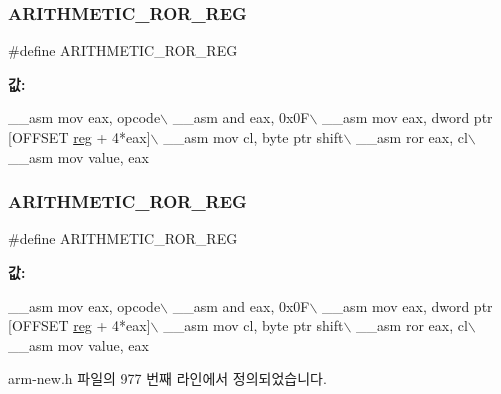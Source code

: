 \subsubsection{\texorpdfstring{A\+R\+I\+T\+H\+M\+E\+T\+I\+C\+\_\+\+R\+O\+R\+\_\+\+R\+EG}{ARITHMETIC\_ROR\_REG}\hspace{0.1cm}{\footnotesize\ttfamily [1/2]}}
{\footnotesize\ttfamily \#define A\+R\+I\+T\+H\+M\+E\+T\+I\+C\+\_\+\+R\+O\+R\+\_\+\+R\+EG}

{\bfseries 값\+:}
\begin{DoxyCode}
\_\_asm mov eax, opcode\(\backslash\)
        \_\_asm and eax, 0x0F\(\backslash\)
        \_\_asm mov eax, dword ptr [OFFSET \mbox{\hyperlink{_g_b_a_8h_ae29faba89509024ffd1a292badcedf2d}{reg}} + 4*eax]\(\backslash\)
        \_\_asm mov cl, byte ptr shift\(\backslash\)
        \_\_asm ror eax, cl\(\backslash\)
        \_\_asm mov value, eax
\end{DoxyCode}
\mbox{\label{arm-new_8h_add20b224236ad60d0152fad9d84f3f9d}} 
\subsubsection{\texorpdfstring{A\+R\+I\+T\+H\+M\+E\+T\+I\+C\+\_\+\+R\+O\+R\+\_\+\+R\+EG}{ARITHMETIC\_ROR\_REG}\hspace{0.1cm}{\footnotesize\ttfamily [2/2]}}
{\footnotesize\ttfamily \#define A\+R\+I\+T\+H\+M\+E\+T\+I\+C\+\_\+\+R\+O\+R\+\_\+\+R\+EG}

{\bfseries 값\+:}
\begin{DoxyCode}
\_\_asm mov eax, opcode\(\backslash\)
        \_\_asm and eax, 0x0F\(\backslash\)
        \_\_asm mov eax, dword ptr [OFFSET \mbox{\hyperlink{_g_b_a_8h_ae29faba89509024ffd1a292badcedf2d}{reg}} + 4*eax]\(\backslash\)
        \_\_asm mov cl, byte ptr shift\(\backslash\)
        \_\_asm ror eax, cl\(\backslash\)
        \_\_asm mov value, eax
\end{DoxyCode}


arm-\/new.\+h 파일의 977 번째 라인에서 정의되었습니다.

\mbox{\label{_g_b_a_8cpp_a975d05336b289f7576556fbeba15a5c4}} 
